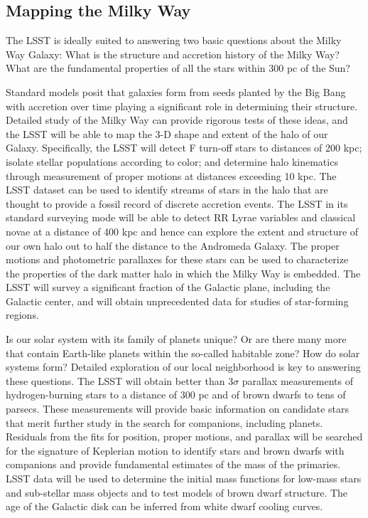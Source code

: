 \subsection{Mapping the Milky Way}

The LSST is ideally suited to answering two basic questions about the Milky
Way Galaxy: What is the structure and accretion history of the Milky Way?
What are the fundamental properties of all the stars within 300 pc of the
Sun?

Standard models posit that galaxies form from seeds planted by the Big Bang
with accretion over time playing a significant role in determining their
structure.  Detailed study of the Milky Way can provide rigorous tests of
these ideas, and the LSST will be able to map the 3-D shape and extent of
the halo of our Galaxy.  Specifically, the LSST will detect F turn-off
stars to distances of 200 kpc; isolate stellar populations according to
color; and determine halo kinematics through measurement of proper motions
at distances exceeding 10 kpc. The LSST dataset can be used to identify
streams of stars in the halo that are thought to provide a fossil record of
discrete accretion events. The LSST in its standard surveying mode will be
able to detect RR Lyrae variables and classical novae at a distance of 400
kpc and hence can explore the extent and structure of our own halo out to
half the distance to the Andromeda Galaxy. The proper motions and
photometric parallaxes for these stars can be used to characterize the
properties of the dark matter halo in which the Milky Way is embedded.
The LSST will survey a significant fraction of the Galactic plane,
including the Galactic center, and will obtain unprecedented data for
studies of star-forming regions.

Is our solar system with its family of planets unique? Or are there many
more that contain Earth-like planets within the so-called habitable zone?
How do solar systems form? Detailed exploration of our local neighborhood
is key to answering these questions.  The LSST will obtain better than
3$\sigma$ parallax measurements of hydrogen-burning stars to a distance of
300 pc and of brown dwarfs to tens of parsecs. These measurements will
provide basic information on candidate stars that merit further study in
the search for companions, including planets.  Residuals from the fits for
position, proper motions, and parallax will be searched for the signature
of Keplerian motion to identify stars and brown dwarfs with companions and
provide fundamental estimates of the mass of the primaries. LSST data will
be used to determine the initial mass functions for low-mass stars and
sub-stellar mass objects and to test models of brown dwarf structure. The
age of the Galactic disk can be inferred from white dwarf cooling curves.

